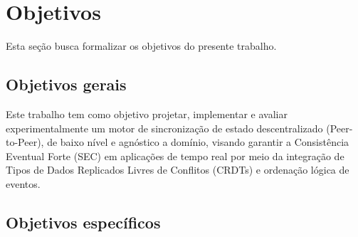 \section{Objetivos}

Esta seção busca formalizar os objetivos do presente trabalho.

\subsection{Objetivos gerais}

Este trabalho tem como objetivo projetar, implementar e avaliar
experimentalmente um motor de sincronização de estado descentralizado
(Peer-to-Peer), de baixo nível e agnóstico a domínio, visando garantir a
Consistência Eventual Forte (SEC) em aplicações de tempo real por meio da
integração de Tipos de Dados Replicados Livres de Conflitos (CRDTs) e
ordenação lógica de eventos.

\subsection{Objetivos específicos}

